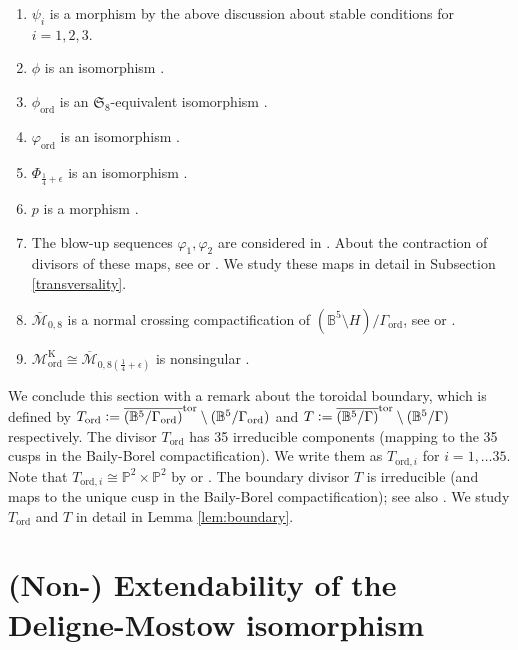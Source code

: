 \documentclass[12pt, pdftex]{amsart}
\theoremstyle{plain}
\theoremstyle{definition}
\numberwithin{equation}{section}
\def\P{{\mathbb P}}
\def\B{{\mathbb B}}
\def\SS{{\mathfrak S}}
\def\ord{\mathrm{ord}}
\def\K{\mathrm{K}}
\def\tor{\mathrm{tor}}
\def\M{\mathcal{M}}
\newcommand{\defeq}{\vcentcolon=}
\begin{document}
\begin{enumerate}
    \item $\psi_i$ is a morphism by the above discussion about stable conditions for $i=1,2,3$.
    \item $\phi$ is an isomorphism \cite{DM86}.
    \item $\phi_{\ord}$ is an $\SS_8$-equivalent isomorphism \cite[Theorem 4.6]{Ko07a}.
    \item $\varphi_{\ord}$ is an isomorphism \cite[Theorem 1.1]{KM11}.
    \item $\Phi_{\frac{1}{4}+\epsilon}$ is an isomorphism \cite[Theorem 1.1]{GKS21}.
    \item $p$ is a morphism \cite[Proposition 2.13]{GKS21}.
    \item The blow-up sequences $\varphi_1, \varphi_2$ are considered in \cite[Theorem 4.1 (i), (iii)]{KM11}.
    About the contraction of divisors of these maps, see \cite[Proposition 4.5]{Ha03} or \cite[p1121]{KM11}.
    We study these maps in detail in Subsection \ref{transversality}.
    \item $\overline{\M}_{0,8}$ is a normal crossing compactification of $(\B^5\setminus H)/\Gamma_{\ord}$, see \cite[p345]{Ha03} or \cite[Proposition 2.13]{GKS21}.
    \item $\M_{\ord}^{\K}\cong\overline{\M}_{0,8(\frac{1}{4}+\epsilon)}$ is nonsingular \cite[Section 4]{KM11}.
\end{enumerate}


We conclude this section with a remark about the toroidal boundary, which is defined by
$T_{\ord}\defeq\overline{(\B^5/\Gamma_{\ord})}^{\tor}\setminus(\B^5/\Gamma_{\ord})$ and $T\defeq\overline{(\B^5/\Gamma)}^{\tor}\setminus(\B^5/\Gamma)$ 
respectively.
The divisor $T_{\ord}$ has 35 irreducible components (mapping to the 35 cusps in the Baily-Borel compactification). We write them as $T_{\ord, i}$ for $i=1,\dots 35$.
Note that $T_{\ord, i}\cong\P^2\times\P^2$ by \cite[Remark 6]{MS21} or \cite[Example 2.12]{GKS21}.
The boundary divisor $T$ is irreducible (and maps to the unique cusp in the Baily-Borel compactification); see also \cite[Proposition 4.7]{Ko07a}.
We study $T_{\ord}$ and $T$ in detail in Lemma \ref{lem:boundary}.



\section{(Non-) Extendability of the Deligne-Mostow isomorphism}
\label{section:extendability}
\end{document}
